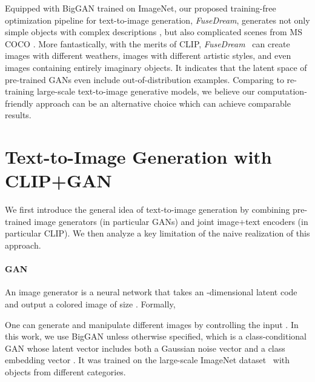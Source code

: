 \documentclass[10pt,twocolumn,letterpaper]{article}
\newcommand{\our}{\emph{FuseDream}}
\newcommand{\ganclip}{CLIP+GAN}
\begin{document}
\iffalse
First, for the optimization objective, we find that the original CLIP score cannot reflect the quality of images and thus propose \texttt{AugCLIP}, which averages the CLIP score of multiple augmented images, as the optimization objective.
Then, for the optimization process, we discuss the initialization, optimizer and injected noise to effectively maximize the proposed \texttt{AugCLIP} scores. 
Thirdly, to increase the capability of the generator to deal with the complicated composition of objects in the query text,
we fuse multiple generated images together. To better the naturalness and quality of images, we further formulate the optimization as a novel bi-level optimization problem \cite{solodov2007bundle, solodov2007bundle}.
We adopt a perceptual loss \cite{johnson2016perceptual} under the constraint that the  score is already optimal,
and effectively solve it with a barrier function gradient based algorithm.
\fi

Equipped with BigGAN trained on ImageNet, 
our proposed training-free optimization pipeline for text-to-image generation, \our, 
generates not only simple objects with complex descriptions
, but also complicated scenes from MS COCO \cite{lin2014microsoft}. More fantastically, with the merits of CLIP, \our~ can create images with different weathers, images with different artistic styles, and even images containing entirely imaginary objects.
It indicates that the latent space of pre-trained GANs even include out-of-distribution examples. 
Comparing to re-training large-scale text-to-image generative models, 
we believe our computation-friendly approach can be an alternative choice which can achieve comparable results. 
\fi  
\section{Text-to-Image Generation with \ganclip}
We first introduce the general idea of text-to-image generation 
by combining pre-trained image generators (in particular GANs)  
and joint image+text encoders (in particular CLIP).  
We then analyze a key limitation of 
 the naive realization of this approach. 


\paragraph{GAN} 
An image generator  is a neural network that takes an -dimensional latent code  and output a  colored image  of size . 
Formally, 

One can generate and manipulate different images by controlling the input . 
In this work, 
we use BigGAN \cite{brock2018large} 
unless otherwise specified, 
which is a class-conditional GAN whose latent vector  includes both a Gaussian noise vector  
and a class embedding vector .  
It was trained on the large-scale ImageNet dataset~\cite{russakovsky2015imagenet} with objects from  different categories.  
\end{document}
